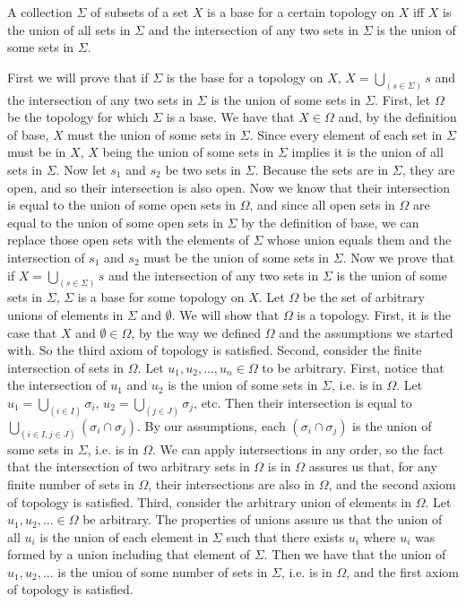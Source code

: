 \begin{majorEx}%
A collection $\Sigma$ of subsets of a set $X$ is a base for a certain topology on $X$ iff $X$ is the union of all sets in $\Sigma$ and
the intersection of any two sets in $\Sigma$ is the union of some sets in $\Sigma$.
\end{majorEx}
First we will prove that if $\Sigma$ is the base for a topology on $X$, $X = \bigcup_(s \in \Sigma) s$ and the intersection of any two sets in $\Sigma$ is the union of some sets in $\Sigma$. First, let $\Omega$ be the topology for which $\Sigma$ is a base. We have that $X \in \Omega$ and, by the definition of base, $X$ must the union of some sets in $\Sigma$. Since every element of each set in $\Sigma$ must be in $X$, $X$ being the union of some sets in $\Sigma$ implies it is the union of all sets in $\Sigma$. Now let $s_1$ and $s_2$ be two sets in $\Sigma$. Because the sets are in $\Sigma$, they are open, and so their intersection is also open. Now we know that their intersection is equal to the union of some open sets in $\Omega$, and since all open sets in $\Omega$ are equal to the union of some open sets in $\Sigma$ by the definition of base, we can replace those open sets with the elements of $\Sigma$ whose union equals them and the intersection of $s_1$ and $s_2$ must be the union of some sets in $\Sigma$.
Now we prove that if $X = \bigcup_(s \in \Sigma) s$ and the intersection of any two sets in $\Sigma$ is the union of some sets in $\Sigma$, $\Sigma$ is a base for some topology on $X$. Let $\Omega$ be the set of arbitrary unions of elements in $\Sigma$ and $\emptyset$. We will show that $\Omega$ is a topology.
First, it is the case that $X$ and $\emptyset \in \Omega$, by the way we defined $\Omega$ and the assumptions we started with. So the third axiom of topology is satisfied.
Second, consider the finite intersection of sets in $\Omega$. Let $u_1, u_2, ..., u_n \in \Omega$ to be arbitrary. First, notice that the intersection of $u_1$ and $u_2$ is the union of some sets in $\Sigma$, i.e. is in $\Omega$. Let $u_1 = \bigcup_(i \in I) \sigma_i$, $u_2= \bigcup_(j \in J) \sigma_j$, etc. Then their intersection is equal to $\bigcup_(i \in I, j \in J) (\sigma_i \cap \sigma_j)$. By our assumptions, each $(\sigma_i \cap \sigma_j)$ is the union of some sets in $\Sigma$, i.e. is in $\Omega$. We can apply intersections in any order, so the fact that the intersection of two arbitrary sets in $\Omega$ is in $\Omega$ assures us that, for any finite number of sets in $\Omega$, their intersections are also in $\Omega$, and the second axiom of topology is satisfied.
Third, consider the arbitrary union of elements in $\Omega$. Let $u_1, u_2, ... \in \Omega$ be arbitrary. The properties of unions assure us that the union of all $u_i$ is the union of each element in $\Sigma$ such that there exists $u_i$ where $u_i$ was formed by a union including that element of $\Sigma$. Then we have that the union of $u_1, u_2, ...$ is the union of some number of sets in $\Sigma$, i.e. is in $\Omega$, and the first axiom of topology is satisfied.

